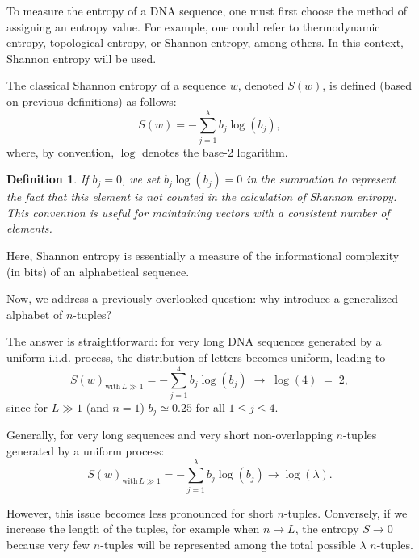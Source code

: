 \documentclass{article}
\newtheorem{Definition}{Definition}[section]
\theoremstyle{remark}
\begin{document}
To measure the entropy of a DNA sequence, one must first choose the method of assigning an entropy value\cite{ref22,ref23}. For example, one could refer to thermodynamic entropy\cite{ref23}, topological entropy\cite{ref6,ref17}, or Shannon entropy\cite{ref5}, among others. In this context, Shannon entropy will be used.

The classical Shannon entropy of a sequence \(w\), denoted \(S(w)\), is defined (based on previous definitions) as follows:
\begin{equation}
S(w) = -\sum_{j=1}^\lambda b_j \log(b_j),
\label{eq:2.1}
\end{equation}
where, by convention, \(\log\) denotes the base-2 logarithm. 

\begin{Definition}\label{def:2.1}
If \(b_j = 0\), we set \(b_j \log(b_j) = 0\) in the summation to represent the fact that this element is not counted in the calculation of Shannon entropy. This convention is useful for maintaining vectors with a consistent number of elements.
\end{Definition}

Here, Shannon entropy is essentially a measure of the informational complexity (in bits) of an alphabetical sequence\cite{ref6}.

Now, we address a previously overlooked question: why introduce a generalized alphabet of \(n\)-tuples?

The answer is straightforward: for very long DNA sequences generated by a uniform i.i.d. process, the distribution of letters becomes uniform, leading to
\begin{equation}
S(w)_{\text{with}\,L\gg 1} = -\sum_{j=1}^{4} b_j \log(b_j) \;\rightarrow\; \log(4) \;=\; 2,
\label{eq:2.2}
\end{equation}
since for \(L\gg 1\) (and \(n=1\)) \(b_j \simeq 0.25\) for all \(1 \le j \le 4\)\cite{ref7}.

Generally, for very long sequences and very short non-overlapping \(n\)-tuples generated by a uniform process:
\begin{equation}
S(w)_{\text{with}\,L\gg 1} = -\sum_{j=1}^\lambda b_j \log(b_j) \rightarrow \log(\lambda).
\label{eq:2.3}
\end{equation}

However, this issue becomes less pronounced for short \(n\)-tuples. Conversely, if we increase the length of the tuples, for example when \(n \to L\), the entropy \(S \to 0\) because very few \(n\)-tuples will be represented among the total possible \(\lambda\) \(n\)-tuples.
\end{document}
